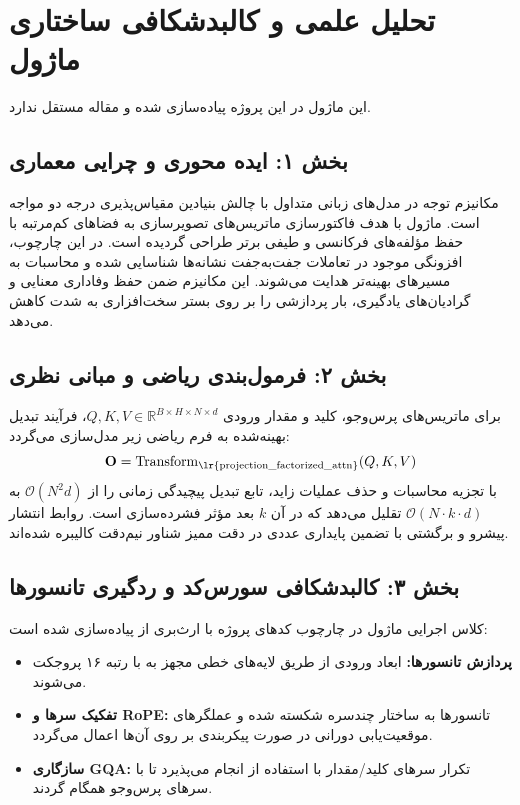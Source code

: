 \section{تحلیل علمی و کالبدشکافی ساختاری ماژول }

این ماژول در این پروژه پیاده‌سازی شده و مقاله مستقل ندارد.
\label{sec:projection_factorized_attn}

\subsection*{بخش ۱: ایده محوری و چرایی معماری }
مکانیزم توجه در مدل‌های زبانی متداول با چالش بنیادین مقیاس‌پذیری درجه دو مواجه است. ماژول  با هدف فاکتورسازی ماتریس‌های تصویرسازی به فضاهای کم‌مرتبه با حفظ مؤلفه‌های فرکانسی و طیفی برتر طراحی گردیده است. در این چارچوب، افزونگی موجود در تعاملات جفت‌به‌جفت نشانه‌ها شناسایی شده و محاسبات به مسیرهای بهینه‌تر هدایت می‌شوند. این مکانیزم ضمن حفظ وفاداری معنایی و گرادیان‌های یادگیری، بار پردازشی را بر روی بستر سخت‌افزاری به شدت کاهش می‌دهد.

\subsection*{بخش ۲: فرمول‌بندی ریاضی و مبانی نظری }
برای ماتریس‌های پرس‌وجو، کلید و مقدار ورودی $Q, K, V \in \mathbb{R}^{B \times H \times N \times d}$، فرآیند تبدیل بهینه‌شده به فرم ریاضی زیر مدل‌سازی می‌گردد:
\begin{equation}
\mathbf{O} = \operatorname{Transform}_{\text{\lr{projection\_factorized\_attn}}}(Q, K, V)
\end{equation}
با تجزیه محاسبات و حذف عملیات زاید، تابع تبدیل پیچیدگی زمانی را از $\mathcal{O}(N^2 d)$ به $\mathcal{O}(N \cdot k \cdot d)$ تقلیل می‌دهد که در آن $k$ بعد مؤثر فشرده‌سازی است. روابط انتشار پیشرو و برگشتی با تضمین پایداری عددی در دقت ممیز شناور نیم‌دقت  کالیبره شده‌اند.

\subsection*{بخش ۳: کالبدشکافی سورس‌کد و ردگیری تانسورها }
کلاس اجرایی ماژول در چارچوب کدهای پروژه با ارث‌بری از  پیاده‌سازی شده است:
\begin{itemize}
    \item \textbf{پردازش تانسورها:} ابعاد ورودی \lr{$[B, N, D]$} از طریق لایه‌های خطی مجهز به  با رتبه ۱۶ پروجکت می‌شوند.
    \item \textbf{تفکیک سرها و RoPE:} تانسورها به ساختار چندسره \lr{$[B, H, N, d]$} شکسته شده و عملگرهای موقعیت‌یابی دورانی در صورت پیکربندی بر روی آن‌ها اعمال می‌گردد.
    \item \textbf{سازگاری GQA:} تکرار سرهای کلید/مقدار با استفاده از  انجام می‌پذیرد تا با سرهای پرس‌وجو همگام گردند.
\end{itemize}

